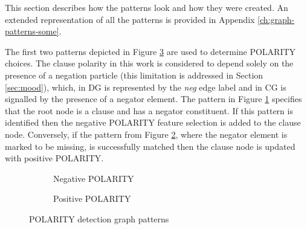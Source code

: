     This section describes how the patterns look and how they were created. An extended representation of all the patterns is provided in Appendix \ref{ch:graph-patterns-some}.

    The first two patterns depicted in Figure \ref{fig:polarity-pattern7} are used to determine POLARITY choices. The clause polarity in this work is considered to depend solely on the presence of a negation particle (this limitation is addressed in Section \ref{sec:mood}), which, in DG is represented by the \textit{neg} edge label and in CG is signalled by the presence of a negator element. The pattern in Figure \ref{fig:neg-pattern5} specifies that the root node is a clause and has a negator constituent. If this pattern is identified then the negative POLARITY feature selection is added to the clause node. Conversely, if the pattern from Figure \ref{fig:neg-pattern6}, where the negator element is marked to be missing, is successfully matched then the clause node is updated with positive POLARITY.

    \begin{figure}[!ht]
        \centering
        \begin{subfigure}[t]{0.47\textwidth}
            \centering
            \caption{Negative POLARITY}
            \label{fig:neg-pattern5}
        \end{subfigure}
        \begin{subfigure}[t]{0.47\textwidth}
            \centering
            \caption{Positive POLARITY}
            \label{fig:neg-pattern6}
        \end{subfigure}
        \caption{POLARITY detection graph patterns}
        \label{fig:polarity-pattern7}
        \end{figure}

